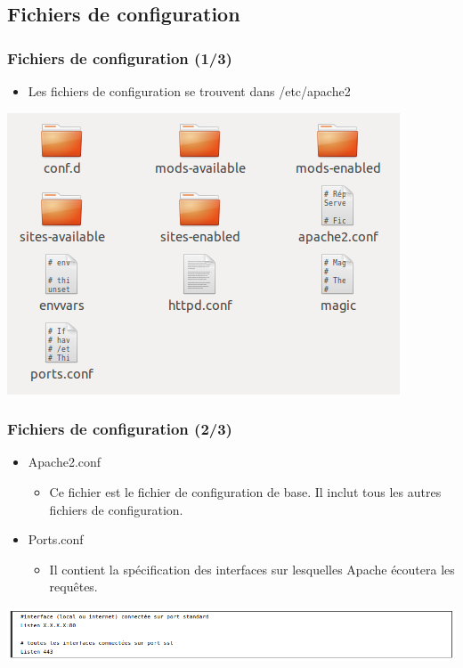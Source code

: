 \subsection{Fichiers de configuration}

\begin{frame}
	\frametitle{Fichiers de configuration (1/3)}
	\begin{itemize}
		\item Les fichiers de configuration se trouvent dans /etc/apache2
	\end{itemize}
	\begin{center}
		\includegraphics[scale=0.3]{Images/fichiers_config.png}
	\end{center}
\end{frame}

\begin{frame}
	\frametitle{Fichiers de configuration (2/3)}
	\begin{itemize}
	      \item Apache2.conf
	      \begin{itemize}
		  \item Ce fichier est le fichier de configuration de base. Il inclut tous les autres fichiers de configuration.
	      \end{itemize}
	      \item Ports.conf
	      \begin{itemize}
		  \item Il contient la spécification des interfaces sur lesquelles Apache écoutera les requêtes.
	      \end{itemize}
	\end{itemize}
	\begin{center}
		\includegraphics[scale=0.3]{Images/ports.png}
	\end{center}
\end{frame}

